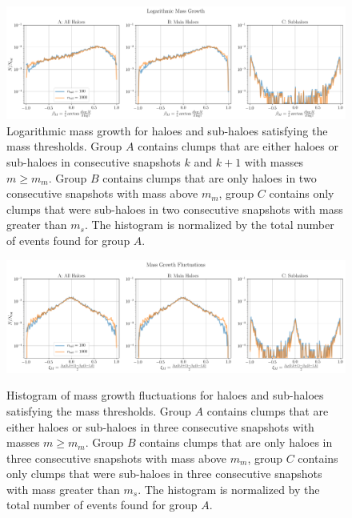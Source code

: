 \begin{figure}
	\centering
	\includegraphics[width=\textwidth, keepaspectratio]{images/tree-statistics-sussing-threshold/mass_growth-ntrace.png}%
	\caption{
		Logarithmic mass growth for haloes and sub-haloes satisfying the mass thresholds.
		Group $A$ contains clumps that are either haloes or sub-haloes in consecutive snapshots $k$ and $k+1$ with masses $m \geq m_{m}$.
		Group $B$ contains clumps that are only haloes in two consecutive snapshots with mass above $m_{m}$, group $C$ contains only clumps that were sub-haloes in two consecutive snapshots with mass greater than $m_{s}$.
		The histogram is normalized by the total number of events found for group $A$.
	}%
	\label{fig:sussing-mass-growth}
\end{figure}

\begin{figure}
	\centering
	\includegraphics[width=\textwidth, keepaspectratio]{images/tree-statistics-sussing-threshold/mass_fluctuations-ntrace.png}\\%
	\caption{
		Histogram of mass growth fluctuations for haloes and sub-haloes satisfying the mass thresholds.
		Group $A$ contains clumps that are either haloes or sub-haloes in three consecutive snapshots with masses $m \geq m_{m}$.
		Group $B$ contains clumps that are only haloes in three consecutive snapshots with mass above $m_{m}$, group $C$ contains only clumps that were sub-haloes in three consecutive snapshots with mass greater than $m_{s}$.
		The histogram is normalized by the total number of events found for group $A$.
	}%
	\label{fig:sussing-mass-fluct}
\end{figure}




